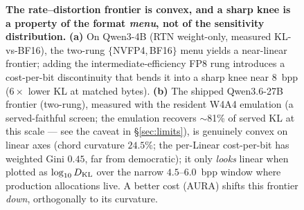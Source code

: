 \begin{figure}[t]
\caption{\textbf{The rate--distortion frontier is convex, and a sharp knee is a
property of the format \emph{menu}, not of the sensitivity distribution.}
\textbf{(a)} On Qwen3-4B (RTN weight-only, measured KL-vs-BF16), the
two-rung $\{$NVFP4,\,BF16$\}$ menu yields a near-linear frontier; adding the
intermediate-efficiency FP8 rung introduces a cost-per-bit discontinuity that
bends it into a sharp knee near $8$~bpp ($6\!\times$ lower KL at matched bytes).
\textbf{(b)} The shipped Qwen3.6-27B frontier (two-rung), measured with
the resident W4A4 emulation (a served-faithful screen; the emulation
recovers $\sim$81\% of served KL at this scale --- see the caveat in
\S\ref{sec:limits}),
is genuinely convex on linear axes (chord curvature $24.5\%$; the per-Linear
cost-per-bit has weighted Gini $0.45$, far from democratic); it only \emph{looks}
linear when plotted as $\log_{10}D_{\mathrm{KL}}$ over the narrow $4.5$--$6.0$~bpp window
where production allocations live. A better cost (AURA) shifts this frontier
\emph{down}, orthogonally to its curvature.}
\label{fig:aura_rd_geometry}
\end{figure}
